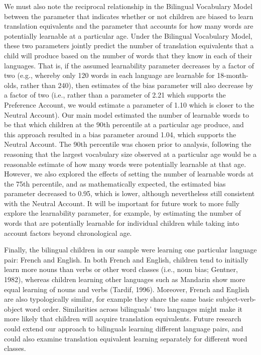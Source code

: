 \documentclass[
  english,
  ,man,floatsintext]{apa6}
\begin{document}
We must also note the reciprocal relationship in the Bilingual Vocabulary Model between the parameter that indicates whether or not children are biased to learn translation equivalents and the parameter that accounts for how many words are potentially learnable at a particular age. Under the Bilingual Vocabulary Model, these two parameters jointly predict the number of translation equivalents that a child will produce based on the number of words that they know in each of their languages. That is, if the assumed learnability parameter decreases by a factor of two (e.g., whereby only 120 words in each language are learnable for 18-month-olds, rather than 240), then estimates of the bias parameter will also decrease by a factor of two (i.e., rather than a parameter of 2.21 which supports the Preference Account, we would estimate a parameter of 1.10 which is closer to the Neutral Account). Our main model estimated the number of learnable words to be that which children at the 90th percentile at a particular age produce, and this approach resulted in a bias parameter around 1.04, which supports the Neutral Account. The 90th percentile was chosen prior to analysis, following the reasoning that the largest vocabulary size observed at a particular age would be a reasonable estimate of how many words were potentially learnable at that age. However, we also explored the effects of setting the number of learnable words at the 75th percentile, and as mathematically expected, the estimated bias parameter decreased to 0.95, which is lower, although nevertheless still consistent with the Neutral Account. It will be important for future work to more fully explore the learnability parameter, for example, by estimating the number of words that are potentially learnable for individual children while taking into account factors beyond chronological age.

Finally, the bilingual children in our sample were learning one particular language pair: French and English. In both French and English, children tend to initially learn more nouns than verbs or other word classes (i.e., noun bias; Gentner, 1982), whereas children learning other languages such as Mandarin show more equal learning of nouns and verbs (Tardif, 1996). Moreover, French and English are also typologically similar, for example they share the same basic subject-verb-object word order. Similarities across bilinguals' two languages might make it more likely that children will acquire translation equivalents. Future research could extend our approach to bilinguals learning different language pairs, and could also examine translation equivalent learning separately for different word classes.
\end{document}
